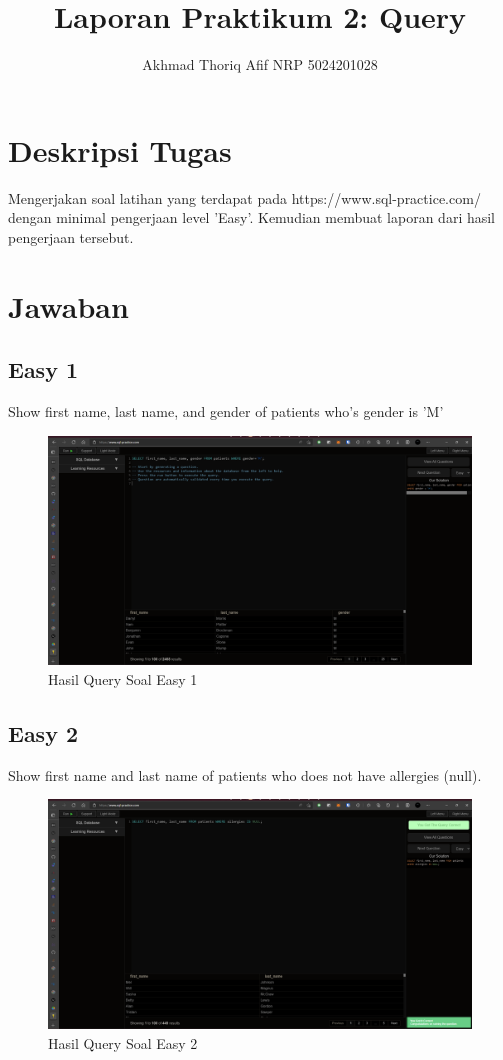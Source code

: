 \documentclass[]{article}
\title{Laporan Praktikum 2: Query}
\author{Akhmad Thoriq Afif NRP 5024201028}
\begin{document}
\maketitle
\section{Deskripsi Tugas}
Mengerjakan soal latihan yang terdapat pada https://www.sql-practice.com/ dengan minimal pengerjaan level 'Easy'. Kemudian membuat laporan dari hasil pengerjaan tersebut. 
\section{Jawaban}
\subsection{Easy 1}
Show first name, last name, and gender of patients who's gender is 'M'

\begin{figure}[H]
    \centering
    \includegraphics[width=12cm]{easy-1.png}
    \caption{Hasil Query Soal Easy 1}
\end{figure}
\subsection{Easy 2}
Show first name and last name of patients who does not have allergies (null).

\begin{figure}[H]
    \centering
    \includegraphics[width=12cm]{easy-2.png}
    \caption{Hasil Query Soal Easy 2}
\end{figure}
\end{document}
